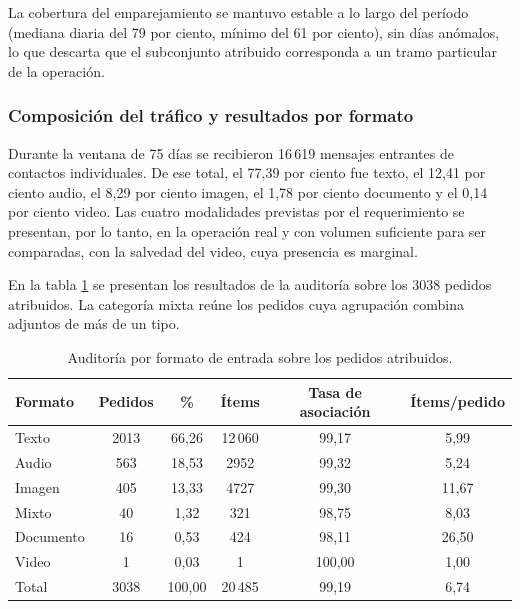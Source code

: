 La cobertura del emparejamiento se mantuvo estable a lo largo del período (mediana diaria del 79 por ciento, mínimo del 61 por ciento), sin días anómalos, lo que descarta que el subconjunto atribuido corresponda a un tramo particular de la operación.

\subsubsection*{Composición del tráfico y resultados por formato}

Durante la ventana de 75 días se recibieron 16\,619 mensajes entrantes de contactos individuales. De ese total, el 77,39 por ciento fue texto, el 12,41 por ciento audio, el 8,29 por ciento imagen, el 1,78 por ciento documento y el 0,14 por ciento video. Las cuatro modalidades previstas por el requerimiento se presentan, por lo tanto, en la operación real y con volumen suficiente para ser comparadas, con la salvedad del video, cuya presencia es marginal.

En la tabla \ref{tab:formatos} se presentan los resultados de la auditoría sobre los 3038 pedidos atribuidos. La categoría mixta reúne los pedidos cuya agrupación combina adjuntos de más de un tipo.

\begin{table}[H]
    \centering
    \caption{Auditoría por formato de entrada sobre los pedidos atribuidos.}
    \label{tab:formatos}
    \begin{tabular}{l c c c c c}
        \toprule
        \textbf{Formato} & \textbf{Pedidos} & \textbf{\%} & \textbf{Ítems} & \textbf{Tasa de asociación} & \textbf{Ítems/pedido} \\
        \midrule
        Texto            & 2013             & 66,26       & 12\,060        & 99,17                       & 5,99                  \\
        Audio            & 563              & 18,53       & 2952           & 99,32                       & 5,24                  \\
        Imagen           & 405              & 13,33       & 4727           & 99,30                       & 11,67                 \\
        Mixto            & 40               & 1,32        & 321            & 98,75                       & 8,03                  \\
        Documento        & 16               & 0,53        & 424            & 98,11                       & 26,50                 \\
        Video            & 1                & 0,03        & 1              & 100,00                      & 1,00                  \\
        \midrule
        Total            & 3038             & 100,00      & 20\,485        & 99,19                       & 6,74                  \\
        \bottomrule
    \end{tabular}
\end{table}

